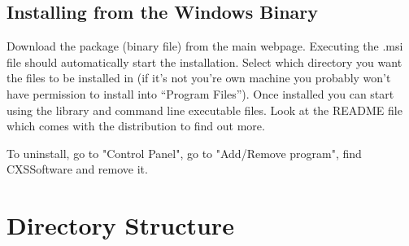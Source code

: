 \documentclass[]{cxs-software}
\begin{document}
\subsection{Installing from the Windows Binary}

Download the package (binary file) from the main webpage. Executing
the .msi file should automatically start the installation. Select
which directory you want the files to be installed in (if it's not
you're own machine you probably won't have permission to install into
``Program Files''). Once installed you can start using the library and
command line executable files. Look at the README file which comes
with the distribution to find out more. 

To uninstall, go to "Control Panel", go to "Add/Remove program", find
CXSSoftware and remove it.


\newpage



\newpage

\section{Directory Structure}
\end{document}
